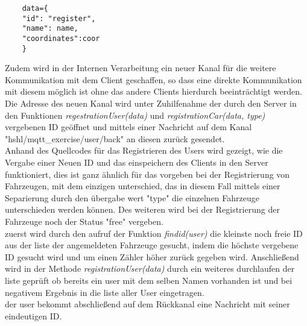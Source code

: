 \documentclass[conference]{IEEEtran}
\begin{document}
\begin{lstlisting}
    data={
    "id": "register",
    "name": name,
    "coordinates":coor
    }	
\end{lstlisting}
Zudem wird in der Internen Verarbeitung ein neuer Kanal für die weitere Kommunikation mit dem Client geschaffen, so dass eine direkte Kommunikation mit diesem möglich ist ohne das andere Clients hierdurch beeinträchtigt werden. Die Adresse des neuen Kanal wird unter Zuhilfenahme  der durch den Server in den Funktionen \textit{regestrationUser(data)} und \textit{registrationCar(data, type)} vergebenen ID geöffnet und mittels einer Nachricht auf dem Kanal \textsf{"hshl/mqtt\_exercise/user/back"} an diesen zurück gesendet. \\
Anhand des Quellcodes für das Registrieren des Users wird gezeigt, wie die Vergabe einer Neuen ID und das einspeichern des Clients in den Server funktioniert, dies ist ganz ähnlich für das vorgeben bei der Registrierung von Fahrzeugen, mit dem einzigen unterschied, das in diesem Fall mittels einer Separierung durch den übergabe wert "type" die einzelnen Fahrzeuge unterschieden werden können. Des weiteren wird bei der Registrierung der Fahrzeuge noch der Status "free" vergeben.\\
zuerst wird durch den aufruf der Funktion \textit{findid(user)} die kleinste noch freie ID aus der liste der angemeldeten Fahrzeuge gesucht, indem die höchste vergebene ID gesucht wird und um einen Zähler höher zurück gegeben wird. Anschließend wird in der Methode \textit{registrationUser(data)} durch ein weiteres durchlaufen der liste geprüft ob bereits ein user mit dem selben Namen vorhanden ist und bei negativem Ergebnis in  die liste aller User eingetragen.\\ der user bekommt abschließend auf dem Rückkanal eine Nachricht mit seiner eindeutigen ID. 
\end{document}
